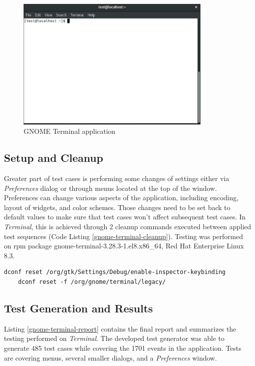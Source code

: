 \begin{figure}[H]
	\centering
	\includegraphics[width=0.85\textwidth,clip]{obrazky-figures/terminal_scr.png}
	\caption{GNOME Terminal application}
	\label{terminal-gui}
\end{figure}

\subsection{Setup and Cleanup}
Greater part of test cases is performing some changes of settings either via \textit{Preferences} dialog or through menus located at the top of the window. Preferences can change various aspects of the application, including encoding, layout of widgets, and color schemes. Those changes need to be set back to default values to make sure that test cases won't affect subsequent test cases. In \textit{Terminal}, this is achieved through 2 cleanup commands executed between applied test sequences (Code Listing \ref{gnome-terminal-cleanup}). Testing was performed on rpm package gnome-terminal-3.28.3-1.el8.x86\_64, Red Hat Enterprise Linux 8.3.

\begin{lstlisting}[caption={Final test generator report},label={gnome-terminal-cleanup}]
    dconf reset /org/gtk/Settings/Debug/enable-inspector-keybinding
    dconf reset -f /org/gnome/terminal/legacy/
\end{lstlisting}

\subsection{Test Generation and Results}

Listing \ref{gnome-terminal-report} contains the final report and summarizes the testing performed on \textit{Terminal}. The developed test generator was able to generate 485 test cases while covering the 1701 events in the application. Tests are covering menus, several smaller dialogs, and a \textit{Preferences} window.

